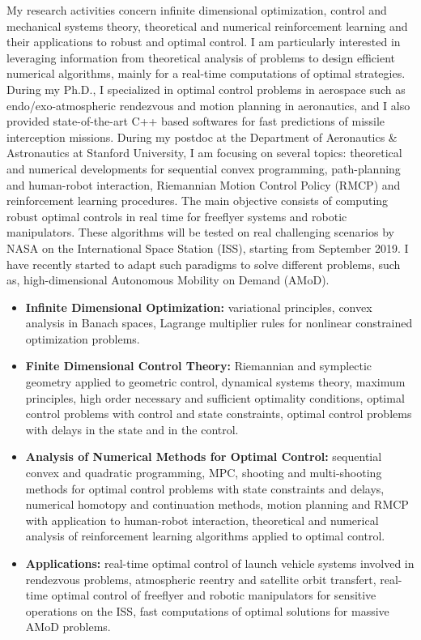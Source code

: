 \documentclass[a4paper,12pt]{article}
\begin{document}
My research activities concern infinite dimensional optimization, control and mechanical systems theory, theoretical and numerical reinforcement learning and their applications to robust and optimal control. I am particularly interested in leveraging information from theoretical analysis of problems to design efficient numerical algorithms, mainly for a real-time computations of optimal strategies. During my Ph.D., I specialized in optimal control problems in aerospace such as endo/exo-atmospheric rendezvous and motion planning in aeronautics, and I also provided state-of-the-art C++ based softwares for fast predictions of missile interception missions. During my postdoc at the Department of Aeronautics \& Astronautics at Stanford University, I am focusing on several topics: theoretical and numerical developments for sequential convex programming, path-planning and human-robot interaction, Riemannian Motion Control Policy (RMCP) and reinforcement learning procedures. The main objective consists of computing robust optimal controls in real time for freeflyer systems and robotic manipulators. These algorithms will be tested on real challenging scenarios by NASA on the International Space Station (ISS), starting from September 2019. I have recently started to adapt such paradigms to solve different problems, such as, high-dimensional Autonomous Mobility on Demand (AMoD). \\

\begin{itemize}
\item \textbf{Infinite Dimensional Optimization:} variational principles, convex analysis in Banach spaces, Lagrange multiplier rules for nonlinear constrained optimization problems.
\item \textbf{Finite Dimensional Control Theory:} Riemannian and symplectic geometry applied to geometric control, dynamical systems theory, maximum principles, high order necessary and sufficient optimality conditions, optimal control problems with control and state constraints, optimal control problems with delays in the state and in the control.
\item \textbf{Analysis of Numerical Methods for Optimal Control:} sequential convex and quadratic programming, MPC, shooting and multi-shooting methods for optimal control problems with state constraints and delays, numerical homotopy and continuation methods, motion planning and RMCP with application to human-robot interaction, theoretical and numerical analysis of reinforcement learning algorithms applied to optimal control.
\item \textbf{Applications:} real-time optimal control of launch vehicle systems involved in rendezvous problems, atmospheric reentry and satellite orbit transfert, real-time optimal control of freeflyer and robotic manipulators for sensitive operations on the ISS, fast computations of optimal solutions for massive AMoD problems.
\end{itemize}
\end{document}
